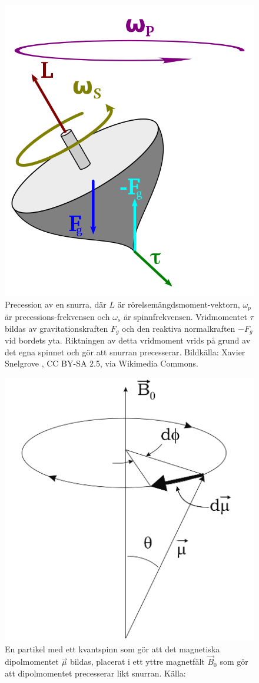 \documentclass[11pt, a4paper]{article}
\begin{document}
\begin{figure}[p]
	\centering
	\includegraphics[width=.5\textwidth]{snurra_precession}
	\caption{Precession av en snurra, där $L$ är rörelsemängdsmoment-vektorn, $\omega_p$ är precessions-frekvensen och $\omega_s$ är spinnfrekvensen. Vridmomentet $\tau$ bildas av gravitationskraften $F_g$ och den reaktiva normalkraften $-F_g$ vid bordets yta. Riktningen av detta vridmoment vrids på grund av det egna spinnet och gör att snurran precesserar. Bildkälla: Xavier Snelgrove \parencite*{fig:snurra_precession}, CC BY-SA 2.5, via Wikimedia Commons.}
	\label{fig:snurra_precession}
\end{figure}
\begin{figure}[p]
	\centering
	\includegraphics[width=.5\textwidth]{magnetic_moment_precession}
	\caption{En partikel med ett kvantspinn som gör att det magnetiska dipolmomentet $\vec\mu$ bildas, placerat i ett yttre magnetfält $\vec B_0$ som gör att dipolmomentet precesserar likt snurran. Källa: \cite{mri_lärobok}}
	\label{fig:magnetiskt_moment_precession}
\end{figure}
\end{document}
